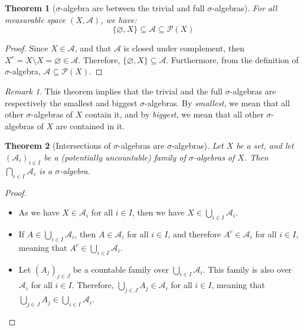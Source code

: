 \documentclass{article}
\newtheorem{theorem}{Theorem}[section]
\theoremstyle{definition}
\theoremstyle{remark}
\newtheorem*{remark}{Remark}
\theoremstyle{example}
\begin{document}
\begin{theorem}[$\sigma$-algebra are between the trivial and full $\sigma$-algebras]
    For all measurable space $(X, \mathcal{A})$, we have:
        $$\{\varnothing, X\} \subseteq \mathcal{A} \subseteq \mathcal{P}(X)$$
\end{theorem}

\begin{proof}
    Since $X \in \mathcal{A}$, and that $\mathcal{A}$ is closed under complement, then $X^c = X \setminus X = \varnothing \in \mathcal{A}$. Therefore, $\{\varnothing, X\} \subseteq \mathcal{A}$. Furthermore, from the definition of $\sigma$-algebra, $\mathcal{A} \subseteq \mathcal{P}(X)$. 
\end{proof}

\begin{remark}
    This theorem implies that the trivial and the full $\sigma$-algebras are respectively the smallest and biggest $\sigma$-algebras. By \textit{smallest}, we mean that all other $\sigma$-algebras of $X$ contain it, and by \textit{biggest}, we mean that all other $\sigma$-algebras of $X$ are contained in it.
\end{remark}

\begin{theorem}[Intersections of $\sigma$-algebras are $\sigma$-algebras]
    Let $X$ be a set, and let $(\mathcal{A}_i)_{i \in I}$ be a (potentially uncountable) family of $\sigma$-algebras of $X$. Then $\bigcap_{i \in I} \mathcal{A}_i$ is a $\sigma$-algebra.
\end{theorem}

\begin{proof}~
    \begin{itemize}
        \item As we have $X \in \mathcal{A}_i$ for all $i \in I$, then we have $X \in \bigcup_{i \in I} \mathcal{A}_i$.
        \item If $A \in \bigcup_{i \in I} \mathcal{A}_i$, then $A \in \mathcal{A}_i$ for all $i \in I$, and therefore $A^c \in \mathcal{A}_i$ for all $i \in I$, meaning that $A^c \in \bigcup_{i \in I} \mathcal{A}_i$.
        \item Let $(A_j)_{j \in J}$ be a countable family over $\bigcup_{i \in I} \mathcal{A}_i$. This family is also over $\mathcal{A}_i$ for all $i \in I$. Therefore, $\bigcup_{j \in J} A_j \in \mathcal{A}_i$ for all $i \in I$, meaning that $\bigcup_{j \in J} A_j \in \bigcup_{i \in I} \mathcal{A}_i$.
    \end{itemize}
\end{proof}
\end{document}
